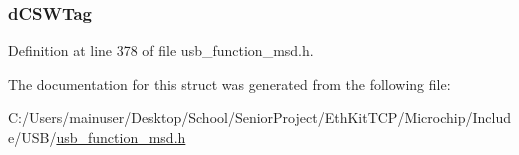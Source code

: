 \subsubsection[{d\+C\+S\+W\+Tag}]{ d\+C\+S\+W\+Tag}\label{struct___u_s_b___m_s_d___c_s_w_ae11dc5d087f1ed22df588b55ff44fc6e}


Definition at line 378 of file usb\+\_\+function\+\_\+msd.\+h.



The documentation for this struct was generated from the following file\+:\begin{DoxyCompactItemize}
\item 
C\+:/\+Users/mainuser/\+Desktop/\+School/\+Senior\+Project/\+Eth\+Kit\+T\+C\+P/\+Microchip/\+Include/\+U\+S\+B/\hyperlink{usb__function__msd_8h}{usb\+\_\+function\+\_\+msd.\+h}\end{DoxyCompactItemize}
